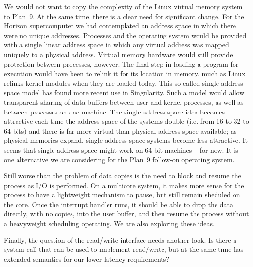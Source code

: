 \documentclass[a4,10pt,preprint]{sigplanconf}
\begin{document}
We would not want to copy the complexity of the Linux virtual memory
system to Plan~9. At the same time, there is a clear need for
significant change. For the Horizon supercomputer\cite{horizon} we had
contemplated an address space in which there were no unique addresses. 
Processes and the operating system would be provided with a single 
linear address space in which any virtual address was mapped uniquely 
to a physical address. Virtual memory hardware would still provide 
protection between processes, however. 
The
final step in loading a program for execution would have been to
relink it for its location in memory, much as Linux relinks kernel
modules when they are loaded today.  This so-called single address
space model has found more recent use in
Singularity\cite{singularity}. Such a model would allow transparent
sharing of data buffers between user and kernel processes, as well as
between processes on one machine. The single address space idea
becomes attractive each time the address space of the systems double
(i.e. from 16 to 32 to 64 bits) and there is far more virtual than
physical address space available; as physical memories expand, single
address space systems become less attractive. It seems that single
address space might work on 64-bit machines -- for now. It is one
alternative we are considering for the Plan~9 follow-on operating
system.

Still worse than the problem of data copies is the need to block and resume the process as I/O is performed. On a multicore system, it makes more sense for the process to have a lightweight mechanism to pause, but still remain sheduled on the core. Once the interrupt handler runs, it should be able to drop the data directly, with no copies, into the user buffer, and then resume the process without a heavyweight scheduling operating. We are also exploring these ideas. 

Finally, the question of the read/write interface needs another
look. Is there a system call that can be used to implement read/write,
but at the same time has extended semantics for our lower latency
requirements?
\end{document}
